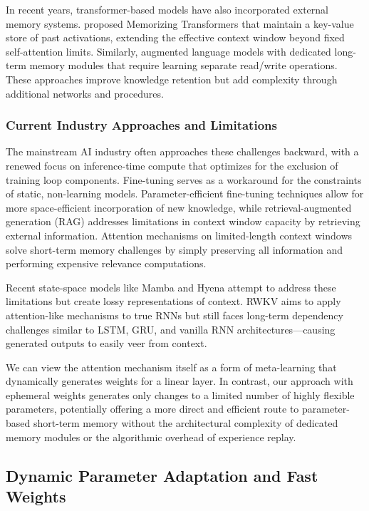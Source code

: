 \documentclass{article} %
\begin{document}
In recent years, transformer-based models have also incorporated external memory systems. \citet{wuMemorizingTransformers2022} proposed Memorizing Transformers that maintain a key-value store of past activations, extending the effective context window beyond fixed self-attention limits. Similarly, \citet{wangAugmentingLanguageModels2023} augmented language models with dedicated long-term memory modules that require learning separate read/write operations. These approaches improve knowledge retention but add complexity through additional networks and procedures.

\subsubsection{Current Industry Approaches and Limitations}

The mainstream AI industry often approaches these challenges backward, with a renewed focus on inference-time compute that optimizes for the exclusion of training loop components. Fine-tuning serves as a workaround for the constraints of static, non-learning models. Parameter-efficient fine-tuning techniques allow for more space-efficient incorporation of new knowledge, while retrieval-augmented generation (RAG) addresses limitations in context window capacity by retrieving external information. Attention mechanisms on limited-length context windows solve short-term memory challenges by simply preserving all information and performing expensive relevance computations.

Recent state-space models like Mamba and Hyena attempt to address these limitations but create lossy representations of context. RWKV aims to apply attention-like mechanisms to true RNNs but still faces long-term dependency challenges similar to LSTM, GRU, and vanilla RNN architectures—causing generated outputs to easily veer from context.

We can view the attention mechanism itself as a form of meta-learning that dynamically generates weights for a linear layer. In contrast, our approach with ephemeral weights generates only changes to a limited number of highly flexible parameters, potentially offering a more direct and efficient route to parameter-based short-term memory without the architectural complexity of dedicated memory modules or the algorithmic overhead of experience replay.

\subsection{Dynamic Parameter Adaptation and Fast Weights}
\end{document}

